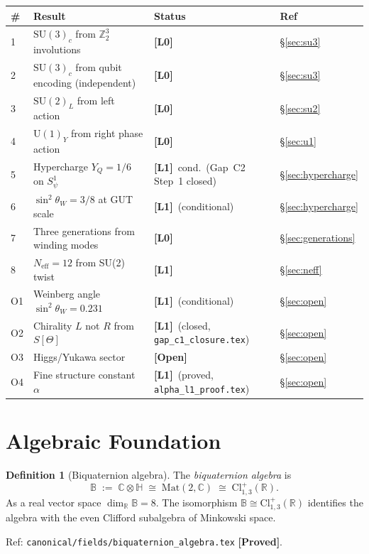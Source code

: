 \documentclass[12pt,a4paper]{article}
\theoremstyle{definition}
\newtheorem{definition}[theorem]{Definition}
\theoremstyle{remark}
\newcommand{\PROVED}{\textbf{[Proved]}}
\newcommand{\OPEN}{\textbf{[Open]}}
\newcommand{\SU}[1]{\mathrm{SU}(#1)}
\newcommand{\UU}[1]{\mathrm{U}(#1)}
\newcommand{\Bq}{\mathbb{C}\otimes\mathbb{H}}
\newcommand{\Lone}{\textbf{[L1]}}
\newcommand{\Lzero}{\textbf{[L0]}}
\begin{document}
\begin{center}
\begin{tabular}{llll}
\toprule
\textbf{\#} & \textbf{Result} & \textbf{Status} & \textbf{Ref} \\
\midrule
1 & $\SU{3}_c$ from $\mathbb{Z}_2^3$ involutions & \Lzero & §\ref{sec:su3} \\
2 & $\SU{3}_c$ from qubit encoding (independent) & \Lzero & §\ref{sec:su3} \\
3 & $\SU{2}_L$ from left action & \Lzero & §\ref{sec:su2} \\
4 & $\UU{1}_Y$ from right phase action & \Lzero & §\ref{sec:u1} \\
5 & Hypercharge $Y_Q = 1/6$ on $S^1_\psi$ & \Lone\ cond.\ (Gap~C2 Step~1 closed) & §\ref{sec:hypercharge} \\
6 & $\sin^2\theta_W = 3/8$ at GUT scale & \Lone\ (conditional) & §\ref{sec:hypercharge} \\
7 & Three generations from winding modes & \Lzero & §\ref{sec:generations} \\
8 & $N_{\mathrm{eff}} = 12$ from SU(2) twist & \Lone & §\ref{sec:neff} \\
\midrule
O1 & Weinberg angle $\sin^2\theta_W = 0.231$ & \Lone\ (conditional) & §\ref{sec:open} \\
O2 & Chirality $L$ not $R$ from $S[\Theta]$ & \Lone\ (closed, \texttt{gap\_c1\_closure.tex}) & §\ref{sec:open} \\
O3 & Higgs/Yukawa sector & \OPEN & §\ref{sec:open} \\
O4 & Fine structure constant $\alpha$ & \Lone\ (proved, \texttt{alpha\_l1\_proof.tex}) & §\ref{sec:open} \\
\bottomrule
\end{tabular}
\end{center}

\section{Algebraic Foundation}
\label{sec:algebra}

\begin{definition}[Biquaternion algebra]
\label{def:biquaternion}
The \emph{biquaternion algebra} is
\[
  \mathbb{B} \;:=\; \Bq \;\cong\; \mathrm{Mat}(2,\mathbb{C})
 \;\cong\; \mathrm{Cl}^{+}_{1,3}(\mathbb{R}).
\]
As a real vector space $\dim_\mathbb{R}\mathbb{B} = 8$.
The isomorphism $\mathbb{B}\cong\mathrm{Cl}^{+}_{1,3}(\mathbb{R})$ identifies
the algebra with the even Clifford subalgebra of Minkowski space.

Ref: \texttt{canonical/fields/biquaternion\_algebra.tex} \PROVED.
\end{definition}
\end{document}
